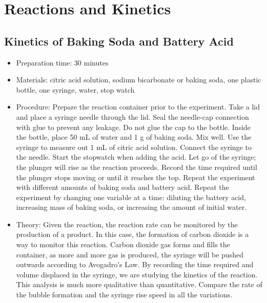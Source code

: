 \section{Reactions and Kinetics}

\subsection{Kinetics of Baking Soda and Battery Acid}
\begin{itemize}
\item{Preparation time: 30 minutes}
\item{Materials: citric acid solution, sodium bicarbonate or baking soda, one plastic bottle, one syringe, water, stop watch}
\item{Procedure: Prepare the reaction container prior to the experiment. Take a lid and place a syringe needle through the lid. Seal the needle-cap connection with glue to prevent any leakage. Do not glue the cap to the bottle. Inside the bottle, place 50 mL of water and 1 g of baking soda. Mix well. Use the syringe to measure out 1 mL of citric acid solution. Connect the syringe to the needle. Start the stopwatch when adding the acid. Let go of the syringe; the plunger will rise as the reaction proceeds. Record the time required until the plunger stops moving or until it reaches the top. Repeat the experiment with different amounts of baking soda and battery acid. Repeat the experiment by changing one variable at a time: diluting the battery acid, increasing mass of baking soda, or increasing the amount of initial water. }
\item{Theory: Given the reaction, the reaction rate can be monitored by the production of a product. In this case, the formation of carbon dioxide is a way to monitor this reaction. Carbon dioxide gas forms and fills the container, as more and more gas is produced, the syringe will be pushed outwards according to Avogadro’s Law. By recording the time required and volume displaced in the syringe, we are studying the kinetics of the reaction. This analysis is much more qualitative than quantitative. Compare the rate of the bubble formation and the syringe rise speed in all the variations. }
\end{itemize}

